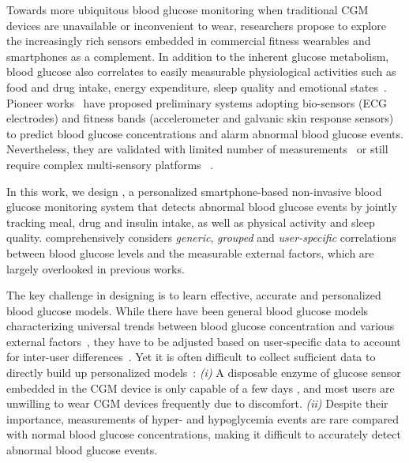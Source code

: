 Towards more ubiquitous blood glucose monitoring when traditional CGM devices are unavailable or inconvenient to wear, researchers propose to explore the increasingly rich sensors embedded in commercial fitness wearables and smartphones as a complement.
In addition to the inherent glucose metabolism, blood glucose also correlates to easily measurable physiological activities such as food and drug intake, energy expenditure, sleep quality and emotional states~\cite{bib:DRCP15:Iwasaki}.
Pioneer works~\cite{bib:EMBC12:Nguyen} \cite{bib:SEMPER16:Ranvier} \cite{bib:JDST14:Sobel} have proposed preliminary systems adopting bio-sensors (\eg ECG electrodes) and fitness bands (\eg accelerometer and galvanic skin response sensors) to predict blood glucose concentrations and alarm abnormal blood glucose events.
Nevertheless, they are validated with limited number of measurements~\cite{bib:SEMPER16:Ranvier}  or still require complex multi-sensory platforms~\cite{bib:EMBC12:Nguyen} \cite{bib:JDST14:Sobel}.

In this work, we design \sysname, a personalized smartphone-based non-invasive blood glucose monitoring system that detects abnormal blood glucose events by jointly tracking meal, drug and insulin intake, as well as physical activity and sleep quality.
\sysname comprehensively considers \textit{generic}, \textit{grouped} and \textit{user-specific} correlations between blood glucose levels and the measurable external factors, which are largely overlooked in previous works.


The key challenge in designing \sysname is to learn effective, accurate and personalized blood glucose models.
While there have been general blood glucose models characterizing universal trends between blood glucose concentration and various external factors~\cite{bib:IJNMBE16:Oviedo}, they have to be adjusted based on user-specific data to account for inter-user differences~\cite{bib:ICMLA13:Bunescu}.
Yet it is often difficult to collect sufficient data to directly build up personalized models~\cite{bib:KDHealth16:Marling}:
\emph{(i)}
A disposable enzyme of glucose sensor embedded in the CGM device is only capable of a few days \cite{bib:CGM_wiki} \cite{bib:CGM_wave}, and most users are unwilling to wear CGM devices frequently due to discomfort.
\emph{(ii)}
Despite their importance, measurements of hyper- and hypoglycemia events are rare compared with normal blood glucose concentrations, making it difficult to accurately detect abnormal blood glucose events.

